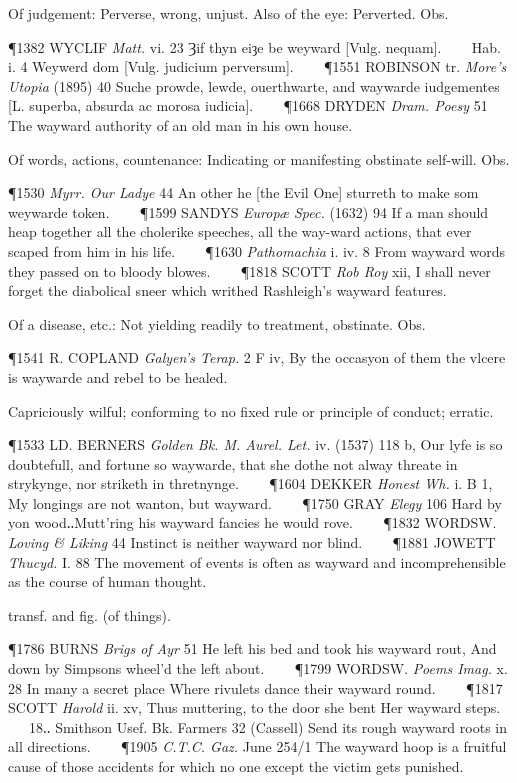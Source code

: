 \begin{description}[wide, labelwidth=!, labelindent=0pt]
\begin{myenumerate}
 Of judgement: Perverse, wrong, unjust. Also of the eye: Perverted. Obs.

\P 1382 WYCLIF  \textit{Matt.} vi. 23 Ȝif thyn eiȝe be weyward [Vulg. nequam].      Hab. i. 4 Weywerd dom [Vulg. judicium perversum].    
\P 1551 ROBINSON tr.  \textit{More's Utopia} (1895) 40 Suche prowde, lewde, ouerthwarte, and waywarde iudgementes [L. superba, absurda ac morosa iudicia].    
\P 1668 DRYDEN  \textit{Dram. Poesy} 51 The wayward authority of an old man in his own house.

 Of words, actions, countenance: Indicating or manifesting obstinate self-will. Obs.

\P 1530  \textit{Myrr. Our Ladye} 44 An other he [the Evil One] sturreth to make som weywarde token.    
\P 1599 SANDYS  \textit{Europæ Spec.} (1632) 94 If a man should heap together all the cholerike speeches, all the way-ward actions, that ever scaped from him in his life.    
\P 1630 \textit{Pathomachia}  i. iv. 8 From wayward words they passed on to bloody blowes.    
\P 1818 SCOTT  \textit{Rob Roy} xii, I shall never forget the diabolical sneer which writhed Rashleigh's wayward features.

 Of a disease, etc.: Not yielding readily to treatment, obstinate. Obs.

\P 1541 R. COPLAND  \textit{Galyen's Terap.} 2 F iv, By the occasyon of them the vlcere is waywarde and rebel to be healed.

 Capriciously wilful; conforming to no fixed rule or principle of conduct; erratic.

\P 1533 LD. BERNERS  \textit{Golden Bk. M. Aurel. Let.} iv. (1537) 118 b, Our lyfe is so doubtefull, and fortune so waywarde, that she dothe not alway threate in strykynge, nor striketh in thretnynge.    
\P 1604 DEKKER  \textit{Honest Wh.} i. B 1, My longings are not wanton, but wayward.    
\P 1750 GRAY  \textit{Elegy} 106 Hard by yon wood‥Mutt'ring his wayward fancies he would rove.    
\P 1832 WORDSW.  \textit{Loving \& Liking} 44 Instinct is neither wayward nor blind.    
\P 1881 JOWETT  \textit{Thucyd.} I. 88 The movement of events is often as wayward and incomprehensible as the course of human thought.

 transf. and fig. (of things).

\P 1786 BURNS  \textit{Brigs of Ayr} 51 He left his bed and took his wayward rout, And down by Simpsons wheel'd the left about.    
\P 1799 WORDSW.  \textit{Poems Imag.} x. 28 In many a secret place Where rivulets dance their wayward round.    
\P 1817 SCOTT  \textit{Harold} ii. xv, Thus muttering, to the door she bent Her wayward steps.    18‥ Smithson Usef. Bk. Farmers 32 (Cassell) Send its rough wayward roots in all directions.    
\P 1905 \textit{C.T.C.  Gaz.} June 254/1 The wayward hoop is a fruitful cause of those accidents for which no one except the victim gets punished.
\end{myenumerate}



\end{description}
